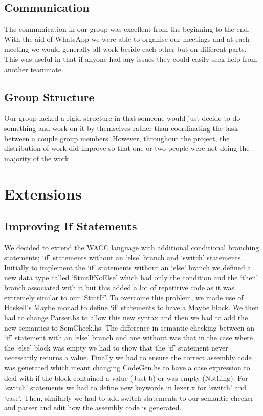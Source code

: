 \documentclass{article}
\begin{document}
\subsection{Communication}
The communication in our group was excellent from the beginning to the end. With the aid of WhatsApp we were able to organise our meetings and at each meeting we would generally all work beside each other but on different parts. This was useful in that if anyone had any issues they could easily seek help from another teammate. 

\subsection{Group Structure}
Our group lacked a rigid structure in that someone would just decide to do something and work on it by themselves rather than coordinating the task between a couple group members. However, throughout the project, the distribution of work did improve so that one or two people were not doing the majority of the work.


\section{Extensions}
\subsection{Improving If Statements}
We decided to extend the WACC language with additional conditional branching statements; `if' statements without an `else' branch and `switch' statements. Initially to implement the `if' statements without an `else' branch we defined a new data type called `StmtIfNoElse' which had only the condition and the `then' branch associated with it but this added a lot of repetitive code as it was extremely similar to our `StmtIf'. To overcome this problem, we made use of Haskell's Maybe monad to  define `if' statements to have a Maybe block. We then had to change Parser.hs to allow this new syntax and then we had to add the new semantics to SemCheck.hs. The difference in semantic checking between an `if' statement with an `else' branch and one without was that in the case where the `else' block was empty we had to show that the `if' statement never necessarily returns a value.  Finally we had to ensure the correct assembly code was generated which meant changing CodeGen.hs to have a case expression to deal with if the block contained a value (Just b) or was empty (Nothing).
For `switch' statements we had to define new keywords in lexer.x for `switch' and `case'. Then, similarly we had to add switch statements to our semantic checker and parser and edit how the assembly code is generated.
\end{document}
